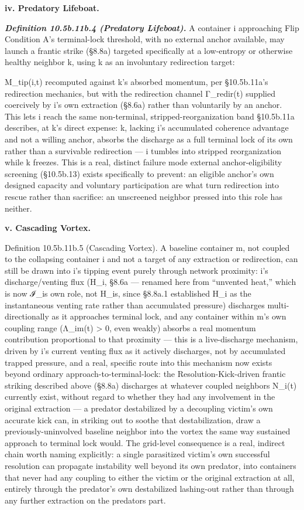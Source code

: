 \documentclass[
]{article}
\begin{document}
\textbf{iv. Predatory Lifeboat.}

\emph{\textbf{Definition 10.5b.11b.4 (Predatory Lifeboat).}} A container
i approaching Flip Condition A's terminal-lock threshold, with no
external anchor available, may launch a frantic strike (§8.8a) targeted
specifically at a low-entropy or otherwise healthy neighbor k, using k
as an involuntary redirection target:

M\_tip(i,t) recomputed against k's absorbed momentum, per §10.5b.11a's
redirection mechanics, but with the redirection channel Γ\_redir(t)
supplied coercively by i's own extraction (§8.6a) rather than
voluntarily by an anchor. This lets i reach the same non-terminal,
stripped-reorganization band §10.5b.11a describes, at k's direct
expense: k, lacking i's accumulated coherence advantage and not a
willing anchor, absorbs the discharge as a full terminal lock of its own
rather than a survivable redirection --- i tumbles into stripped
reorganization while k freezes. This is a real, distinct failure mode
external anchor-eligibility screening (§10.5b.13) exists specifically to
prevent: an eligible anchor's own designed capacity and voluntary
participation are what turn redirection into rescue rather than
sacrifice: an unscreened neighbor pressed into this role has neither.

\textbf{v. Cascading Vortex.}

Definition 10.5b.11b.5 (Cascading Vortex). A baseline container m, not
coupled to the collapsing container i and not a target of any extraction
or redirection, can still be drawn into i's tipping event purely through
network proximity: i's discharge/venting flux (H\_i, §8.6a --- renamed
here from ``unvented heat,'' which is now ℐ\_is own role, not H\_is,
since §8.8a.1 established H\_i as the instantaneous venting rate rather
than accumulated pressure) discharges multi-directionally as it
approaches terminal lock, and any container within m's own coupling
range (Λ\_im(t) \textgreater{} 0, even weakly) absorbs a real momentum
contribution proportional to that proximity --- this is a live-discharge
mechanism, driven by i's current venting flux as it actively discharges,
not by accumulated trapped pressure, and a real, specific route into
this mechanism now exists beyond ordinary approach-to-terminal-lock: the
Resolution-Kick-driven frantic striking described above (§8.8a)
discharges at whatever coupled neighbors N\_i(t) currently exist,
without regard to whether they had any involvement in the original
extraction --- a predator destabilized by a decoupling victim's own
accurate kick can, in striking out to soothe that destabilization, draw
a previously-uninvolved baseline neighbor into the vortex the same way
sustained approach to terminal lock would. The grid-level consequence is
a real, indirect chain worth naming explicitly: a single parasitized
victim's own successful resolution can propagate instability well beyond
its own predator, into containers that never had any coupling to either
the victim or the original extraction at all, entirely through the
predator's own destabilized lashing-out rather than through any further
extraction on the predators part.
\end{document}
